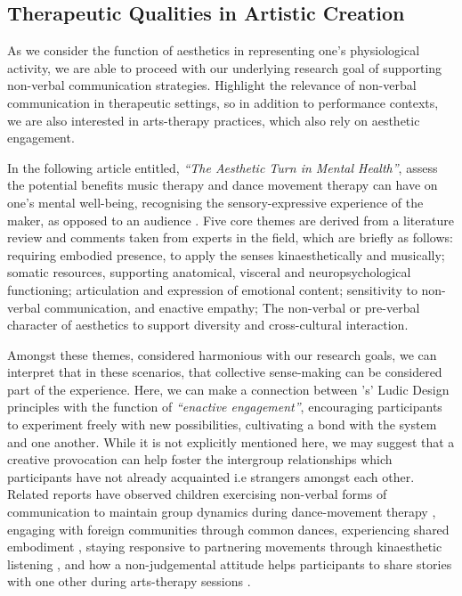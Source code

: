 \subsection*{Therapeutic Qualities in Artistic Creation}

As we consider the function of aesthetics in representing one's physiological activity, we are able to proceed with our underlying research goal of supporting non-verbal communication strategies. Highlight the relevance of non-verbal communication in therapeutic settings, so in addition to performance contexts, we are also interested in arts-therapy practices, which also rely on aesthetic engagement.

In the following article entitled, \textit{``The Aesthetic Turn in Mental Health''}, \citeauthor{samaritter_aesthetic_2018} assess the potential benefits music therapy and dance movement therapy can have on one's mental well-being, recognising the sensory-expressive experience of the maker, as opposed to an audience \cite{samaritter_aesthetic_2018}. Five core themes are derived from a literature review and comments taken from experts in the field, which are briefly as follows: requiring embodied presence, to apply the senses kinaesthetically and musically; somatic resources, supporting anatomical, visceral and neuropsychological functioning; articulation and expression of emotional content; sensitivity to non-verbal communication, and enactive empathy; The non-verbal or pre-verbal character of aesthetics to support diversity and cross-cultural interaction.

Amongst these themes, considered harmonious with our research goals, we can interpret that in these scenarios, that collective sense-making can be considered part of the experience. Here, we can make a connection between \citeauthor{gaver_drift_2004}'s' Ludic Design principles \cite{gaver_drift_2004} with the function of \textit{``enactive engagement''}, encouraging participants to experiment freely with new possibilities, cultivating a bond with the system and one another. While it is not explicitly mentioned here, we may suggest that a creative provocation can help foster the intergroup relationships which participants have not already acquainted i.e strangers amongst each other. Related reports have observed children exercising non-verbal forms of communication to maintain group dynamics during dance-movement therapy \cite{ylonen_kinaesthetic_2009}, engaging with foreign communities through common dances, experiencing shared embodiment \cite{hoppu_other_2013}, staying responsive to partnering movements through kinaesthetic listening \cite{ylonen_bodily_2003}, and how a non-judgemental attitude helps participants to share stories with one other during arts-therapy sessions \cite{kalmanowitz_out_2016}.

